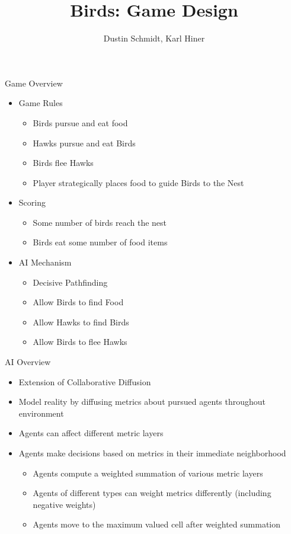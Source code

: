 \documentclass{beamer}
\begin{document}
\title{Birds: Game Design}
\author{Dustin Schmidt, Karl Hiner}
\maketitle

\begin{frame}{Game Overview}
  \begin{itemize}
  \item Game Rules
    \begin{itemize}
	\item Birds pursue and eat food
	\item Hawks pursue and eat Birds
	\item Birds flee Hawks
	\item Player strategically places food to guide Birds to the Nest
    \end{itemize}
  \item Scoring
    \begin{itemize}
	\item Some number of birds reach the nest
	\item Birds eat some number of food items
    \end{itemize}
  \item AI Mechanism
    \begin{itemize}
	\item Decisive Pathfinding
	\item Allow Birds to find Food
	\item Allow Hawks to find Birds
	\item Allow Birds to flee Hawks
    \end{itemize}
  \end{itemize} 

\end{frame}

\begin{frame}{AI Overview}
  \begin{itemize}
  \item Extension of Collaborative Diffusion
  \item Model reality by diffusing metrics about pursued agents throughout environment
  \item Agents can affect different metric layers
  \item Agents make decisions based on metrics in their immediate neighborhood
    \begin{itemize}
	\item Agents compute a weighted summation of various metric layers
	\item Agents of different types can weight metrics differently (including negative weights)
	\item Agents move to the maximum valued cell after weighted summation
    \end{itemize}
  \end{itemize}

\end{frame}
\end{document}
